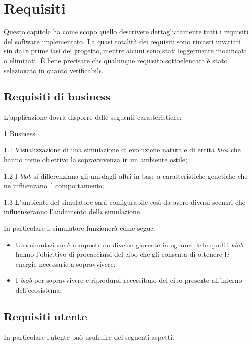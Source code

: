 \chapter{Requisiti}
Questo capitolo ha come scopo quello descrivere dettagliatamente tutti i requisiti del software implementato. La quasi totalità dei requisiti sono rimasti invariati sin dalle prime fasi del progetto, mentre alcuni sono stati leggermente modificati o eliminati. È bene precisare che qualunque requisito sottoelencato è stato selezionato in quanto verificabile.

\section{Requisiti di business}

L'applicazione dovrà disporre delle seguenti caratteristiche:
\begin{myEnumerate}
    \item[1] Business.
    \begin{myEnumerate}[label*=\arabic*.]
        \item[1.1] Visualizzazione di una simulazione di evoluzione naturale di entità \textit{blob} che hanno come obiettivo la sopravvivenza in un ambiente ostile;
        \item[1.2] I \textit{blob} si differenziano gli uni dagli altri in base a caratteristiche genetiche che ne influenzano il comportamento;
        \item[1.3] L'ambiente del simulatore sarà configurabile così da avere diversi scenari che influenzeranno l'andamento della simulazione.
    \end{myEnumerate}
\end{myEnumerate}

In particolare il simulatore funzionerà come segue:
\begin{itemize}
    \item Una simulazione è composta da diverse giornate in ognuna delle quali i \textit{blob} hanno l'obiettivo di procacciarsi del cibo che gli consenta di ottenere le energie necessarie a sopravvivere;
    \item I \textit{blob} per sopravvivere e riprodursi necessitano del cibo presente all'interno dell'ecosistema;
\end{itemize}

\section{Requisiti utente}
In particolare l'utente può usufruire dei seguenti aspetti:

